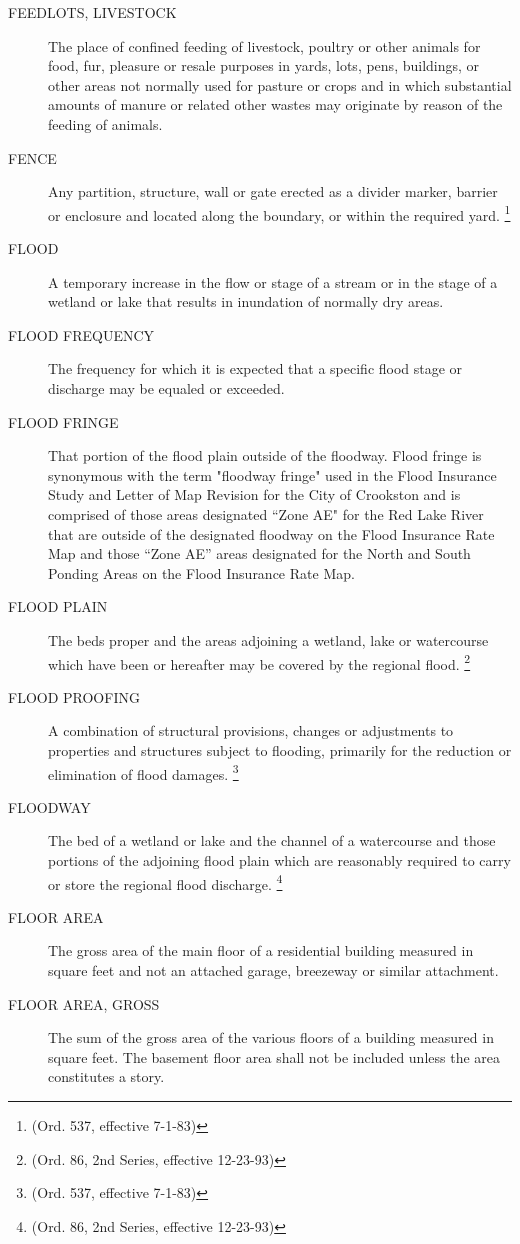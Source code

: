 \begin{description}
    \item[FEEDLOTS, LIVESTOCK] The place of confined feeding of livestock, poultry or other animals for food, fur, pleasure or resale purposes in yards, lots, pens, buildings, or other areas not normally used for pasture or crops and in which substantial amounts of manure or related other wastes may originate by reason of the feeding of animals.
    \item[FENCE] Any partition, structure, wall or gate erected as a divider marker, barrier or enclosure and located along the boundary, or within the required yard. \footnote{(Ord. 537, effective 7-1-83)}
    \item[FLOOD] A temporary increase in the flow or stage of a stream or in the stage of a wetland or lake that results in inundation of normally dry areas.
    \item[FLOOD FREQUENCY] The frequency for which it is expected that a specific flood stage or discharge may be equaled or exceeded.
    \item[FLOOD FRINGE] That portion of the flood plain outside of the floodway. Flood fringe is synonymous with the term "floodway fringe" used in the Flood Insurance Study and Letter of Map Revision for the City of Crookston and is comprised of those areas designated “Zone AE" for the Red Lake River that are outside of the designated floodway on the Flood Insurance Rate Map and those “Zone AE” areas designated for the North and South Ponding Areas on the Flood Insurance Rate Map.
    \item[FLOOD PLAIN] The beds proper and the areas adjoining a wetland, lake or watercourse which have been or hereafter may be covered by the regional flood. \footnote{(Ord. 86, 2nd Series, effective 12-23-93)}
    \item[FLOOD PROOFING] A combination of structural provisions, changes or adjustments to properties and structures subject to flooding, primarily for the reduction or elimination of flood damages. \footnote{(Ord. 537, effective 7-1-83)}
    \item[FLOODWAY] The bed of a wetland or lake and the channel of a watercourse and those portions of the adjoining flood plain which are reasonably required to carry or store the regional flood discharge. \footnote{(Ord. 86, 2nd Series, effective 12-23-93)}
    \item[FLOOR AREA] The gross area of the main floor of a residential building measured in square feet and not an attached garage, breezeway or similar attachment.
    \item[FLOOR AREA, GROSS]The sum of the gross area of the various floors of a building measured in square feet. The basement floor area shall not be included unless the area constitutes a story.

\end{description}
